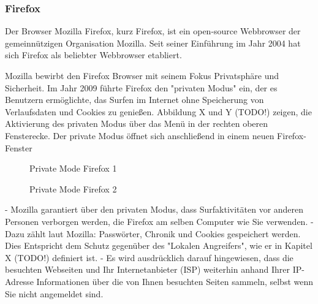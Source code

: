 \subsubsection*{Firefox}

Der Browser Mozilla Firefox, kurz Firefox, ist ein open-source Webbrowser der gemeinnützigen Organisation Mozilla. 
Seit seiner Einführung im Jahr 2004 hat sich Firefox als beliebter Webbrowser etabliert. 

Mozilla bewirbt den Firefox Browser mit seinem Fokus Privatsphäre und Sicherheit.
Im Jahr 2009 führte Firefox den "privaten Modus" ein, der es Benutzern ermöglichte, das Surfen im Internet ohne Speicherung von Verlaufsdaten und Cookies zu genießen.
Abbildung X und Y (TODO!) zeigen, die Aktivierung des privaten Modus über das Menü in der rechten oberen Fensterecke. Der private Modus öffnet sich anschließend in einem neuen Firefox-Fenster

\begin{figure}[h!]
	\caption{Private Mode Firefox 1}
\end{figure}

\begin{figure}[h!]
	\caption{Private Mode Firefox 2}
\end{figure}

- Mozilla garantiert über den privaten Modus, dass Surfaktivitäten vor anderen Personen verborgen werden, die Firefox am selben Computer wie Sie verwenden. 
- Dazu zählt laut Mozilla: Passwörter, Chronik und Cookies gespeichert werden.
Dies Entspricht dem Schutz gegenüber des "Lokalen Angreifers", wie er in Kapitel X (TODO!) definiert ist.
- Es wird ausdrücklich darauf hingewiesen, dass die besuchten Webseiten und Ihr Internetanbieter (ISP)  weiterhin anhand Ihrer IP-Adresse Informationen über die von Ihnen besuchten Seiten sammeln, selbst wenn Sie nicht angemeldet sind. 

